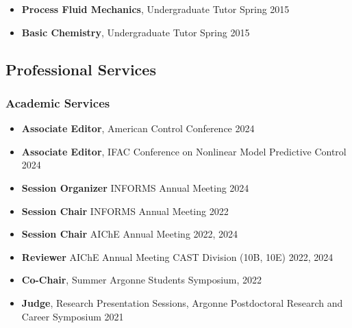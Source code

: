 \message{ !name(shin-abet.tex)}\documentclass[letterpaper, 11pt]{article}
\begin{document}
\begin{itemize}[itemsep=1pt, parsep=0pt,leftmargin=*]
\begin{itemize}[leftmargin=*,itemsep=0pt]
  \item[] \textbf{Process Fluid Mechanics}, Undergraduate Tutor \hfill Spring 2015
  \item[] \textbf{Basic Chemistry}, Undergraduate Tutor \hfill Spring 2015
  \end{itemize}
\end{itemize}


\subsection*{Professional Services}
\subsubsection*{Academic Services}
\begin{itemize}[leftmargin=*,itemsep=-1pt]
  \item[] \textbf{Associate Editor}, American Control Conference \hfill 2024
  \item[] \textbf{Associate Editor}, IFAC Conference on Nonlinear Model Predictive Control \hfill 2024
\item[] \textbf{Session Organizer} INFORMS Annual Meeting \hfill 2024
\item[] \textbf{Session Chair} INFORMS Annual Meeting \hfill 2022
\item[] \textbf{Session Chair} AIChE Annual Meeting \hfill 2022, 2024
\item[] \textbf{Reviewer} AIChE Annual Meeting CAST Division (10B, 10E) \hfill 2022, 2024
\item[] \textbf{Co-Chair}, Summer Argonne Students Symposium, \hfill 2022
\item[] \textbf{Judge}, Research Presentation Sessions, Argonne Postdoctoral Research and Career Symposium \hfill 2021
\end{itemize}
\end{document}
